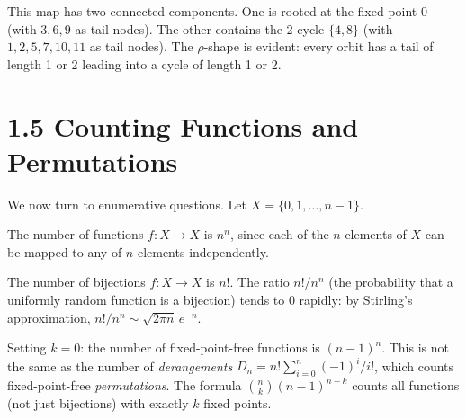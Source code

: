 This map has two connected components. One is rooted at the fixed point $0$ (with $3, 6, 9$ as tail nodes). The other contains the 2-cycle $\{ 4, 8\} $ (with $1, 2, 5, 7, 10, 11$ as tail nodes). The $\rho$-shape is evident: every orbit has a tail of length 1 or 2 leading into a cycle of length 1 or 2.

\section{1.5 Counting Functions and Permutations}

We now turn to enumerative questions. Let $X = \{ 0, 1, \ldots, n-1\} $.

\begin{proposition}
The number of functions $f: X \to X$ is $n^n$, since each of the $n$ elements of $X$ can be mapped to any of $n$ elements independently.
\end{proposition}

\begin{proposition}[Permutations]
The number of bijections $f: X \to X$ is $n!$. The ratio $n!/n^n$ (the probability that a uniformly random function is a bijection) tends to 0 rapidly: by Stirling's approximation, $n!/n^n \sim \sqrt{2\pi n}\, e^{-n}$.
\end{proposition}


\begin{remark}
Setting $k = 0$: the number of fixed-point-free functions is $(n-1)^n$. This is not the same as the number of \textit{derangements} $D_n = n!\sum_{i=0}^{n}(-1)^i/i!$, which counts fixed-point-free \textit{permutations}. The formula $\binom{n}{k}(n-1)^{n-k}$ counts all functions (not just bijections) with exactly $k$ fixed points.
\end{remark}

